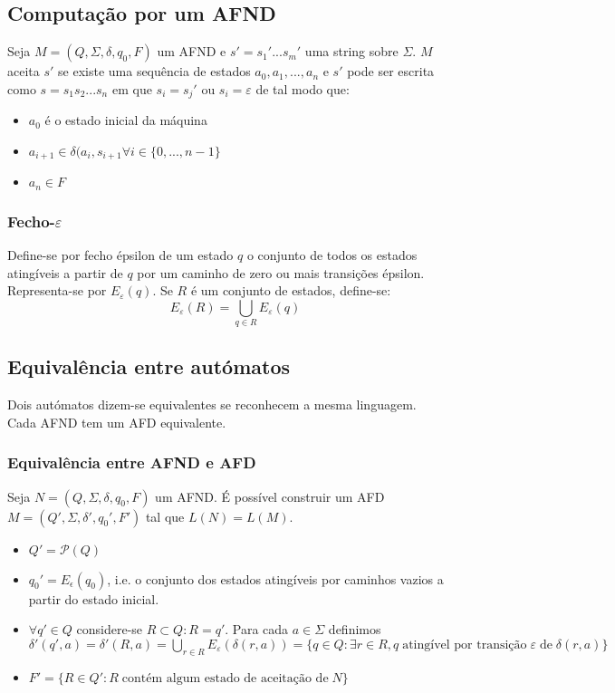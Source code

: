 \documentclass[10pt,a4paper]{report}
\begin{document}
\subsection{Computação por um AFND}
Seja $M = (Q,\Sigma,\delta,q_0,F)$ um AFND e $s'=s_1'...s_m'$ uma string sobre $\Sigma$. $M$ aceita $s'$ se existe uma sequência de estados $a_0,a_1,...,a_n$ e $s'$ pode ser escrita como $s=s_1s_2...s_n$ em que $s_i = s_j'$ ou $s_i = \varepsilon$ de tal modo que:
\begin{itemize}
\item $a_0$ é o estado inicial da máquina
\item $a_{i+1} \in \delta(a_i,s_{i+1} \forall i \in \{0,...,n-1\}$
\item $a_n \in F$ 
\end{itemize}
\subsubsection{Fecho-$\varepsilon$}
Define-se por fecho épsilon de um estado $q$ o conjunto de todos os estados atingíveis a partir de $q$ por um caminho de zero ou mais transições épsilon. Representa-se por $E_\varepsilon(q)$. Se $R$ é um conjunto de estados, define-se:
$$E_\varepsilon(R) = \bigcup_{q\in R} E_\varepsilon(q)$$
\subsection{Equivalência entre autómatos}
Dois autómatos dizem-se equivalentes se reconhecem a mesma linguagem.\\
Cada AFND tem um AFD equivalente.
\subsubsection{Equivalência entre AFND e AFD}
Seja $N=(Q,\Sigma,\delta,q_0,F)$ um AFND. É possível construir um AFD $M=(Q',\Sigma,\delta',q_0',F')$ tal que $L(N)=L(M)$.
\begin{itemize}
\item $Q' = \mathcal{P}(Q)$
\item $q_0' = E_\epsilon(q_0)$, i.e. o conjunto dos estados atingíveis por caminhos vazios a partir do estado inicial.
\item $\forall q' \in Q$ considere-se $R\subset Q:R = q'$. Para cada $a \in \Sigma$ definimos $\delta'(q',a) = \delta'(R,a) = \bigcup_{r\in R} E_\varepsilon(\delta(r,a)) = \{q\in Q: \exists r \in R,q \; \text{atingível por transição} \; \varepsilon \; \text{de} \; \delta(r,a)\}$
\item $F' = \{R\in Q':R \; \text{contém algum estado de aceitação de} \; N\}$
\end{itemize}
\end{document}
